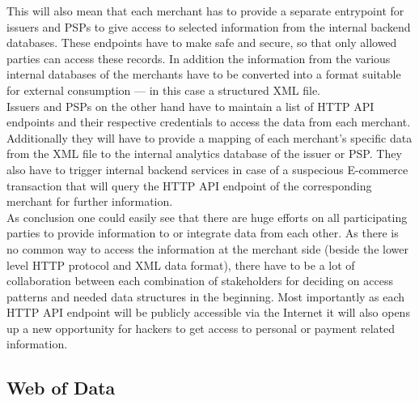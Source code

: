 This will also mean that each merchant has to provide a separate entrypoint for issuers and \gls{PSP}s to give access to selected information from the internal backend databases. These endpoints have to make safe and secure, so that only allowed parties can access these records. In addition the information from the various internal databases of the merchants have to be converted into a format suitable for external consumption --- in this case a structured \gls{XML} file. \\

Issuers and \gls{PSP}s on the other hand have to maintain a list of \gls{HTTP} \gls{API} endpoints and their respective credentials to access the data from each merchant. Additionally they will have to provide a mapping of each merchant's specific data from the \gls{XML} file to the internal analytics database of the issuer or \gls{PSP}. They also have to trigger internal backend services in case of a suspecious E-commerce transaction that will query the \gls{HTTP} \gls{API} endpoint of the corresponding merchant for further information. \\

As conclusion one could easily see that there are huge efforts on all participating parties to provide information to or integrate data from each other. As there is no common way to access the information at the merchant side (beside the lower level HTTP protocol and XML data format), there have to be a lot of collaboration between each combination of stakeholders for deciding on access patterns and needed data structures in the beginning. Most importantly as each \gls{HTTP} \gls{API} endpoint will be publicly accessible via the Internet it will also opens up a new opportunity for hackers to get access to personal or payment related information.


\subsection{Web of Data}
\label{subsec:web_data}


